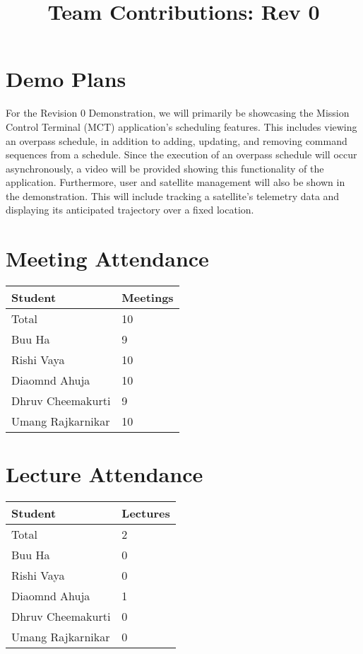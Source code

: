 \documentclass{article}
\title{Team Contributions: Rev 0\\\progname}
\author{\authname}
\date{}
\begin{document}
\maketitle

\section{Demo Plans}

For the Revision 0 Demonstration, we will primarily be showcasing the Mission Control Terminal (MCT) application's scheduling features. This includes viewing an overpass schedule, in addition to adding, updating, and removing command sequences from a schedule. Since the execution of an overpass schedule will occur asynchronously, a video will be provided showing this functionality of the application. Furthermore, user and satellite management will also be shown in the demonstration. This will include tracking a satellite's telemetry data and displaying its anticipated trajectory over a fixed location.

\section{Meeting Attendance}

\begin{table}[H]
\centering
\begin{tabular}{ll}
\toprule
\textbf{Student} & \textbf{Meetings}\\
\midrule
Total & 10\\
Buu Ha & 9\\
Rishi Vaya & 10\\
Diaomnd Ahuja & 10\\
Dhruv Cheemakurti & 9\\
Umang Rajkarnikar & 10\\
\bottomrule
\end{tabular}
\end{table}

\section{Lecture Attendance}

\begin{table}[H]
\centering
\begin{tabular}{ll}
\toprule
\textbf{Student} & \textbf{Lectures}\\
\midrule
Total & 2\\
Buu Ha & 0\\
Rishi Vaya & 0\\
Diaomnd Ahuja & 1\\
Dhruv Cheemakurti & 0\\
Umang Rajkarnikar & 0\\
\bottomrule
\end{tabular}
\end{table}
\end{document}

